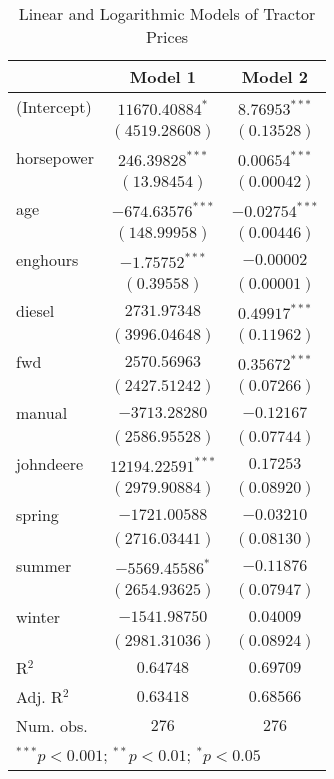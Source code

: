 
\begin{table}
\begin{center}
\begin{tabular}{l c c}
\hline
 & Model 1 & Model 2 \\
\hline
(Intercept) & $11670.40884^{*}$   & $8.76953^{***}$  \\
            & $(4519.28608)$      & $(0.13528)$      \\
horsepower  & $246.39828^{***}$   & $0.00654^{***}$  \\
            & $(13.98454)$        & $(0.00042)$      \\
age         & $-674.63576^{***}$  & $-0.02754^{***}$ \\
            & $(148.99958)$       & $(0.00446)$      \\
enghours    & $-1.75752^{***}$    & $-0.00002$       \\
            & $(0.39558)$         & $(0.00001)$      \\
diesel      & $2731.97348$        & $0.49917^{***}$  \\
            & $(3996.04648)$      & $(0.11962)$      \\
fwd         & $2570.56963$        & $0.35672^{***}$  \\
            & $(2427.51242)$      & $(0.07266)$      \\
manual      & $-3713.28280$       & $-0.12167$       \\
            & $(2586.95528)$      & $(0.07744)$      \\
johndeere   & $12194.22591^{***}$ & $0.17253$        \\
            & $(2979.90884)$      & $(0.08920)$      \\
spring      & $-1721.00588$       & $-0.03210$       \\
            & $(2716.03441)$      & $(0.08130)$      \\
summer      & $-5569.45586^{*}$   & $-0.11876$       \\
            & $(2654.93625)$      & $(0.07947)$      \\
winter      & $-1541.98750$       & $0.04009$        \\
            & $(2981.31036)$      & $(0.08924)$      \\
\hline
R$^2$       & $0.64748$           & $0.69709$        \\
Adj. R$^2$  & $0.63418$           & $0.68566$        \\
Num. obs.   & $276$               & $276$            \\
\hline
\multicolumn{3}{l}{\scriptsize{$^{***}p<0.001$; $^{**}p<0.01$; $^{*}p<0.05$}}
\end{tabular}
\caption{Linear and Logarithmic Models of Tractor Prices}
\label{tab:reg_price_w_log}
\end{center}
\end{table}
